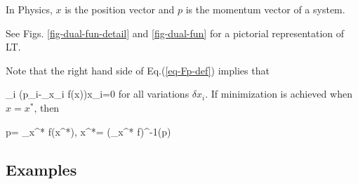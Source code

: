 In Physics, $x$ is the position
vector and $p$ is the momentum 
vector of a system.

See Figs.
\ref{fig-dual-fun-detail}
and \ref{fig-dual-fun}
for a pictorial
representation
of LT.

Note that 
the right hand side of
Eq.(\ref{eq-Fp-def})
implies that

\beq
\sum_i
(p_i-\partial_{x_i}
f(x))\delta x_i=0
\eeq 
for all variations $\delta x_i$.
If minimization is achieved
when $x=x^*$, then

\beq 
p= \nabla_{x^*} f(x^*),
\quad x^*=
(\nabla_{x^*} f)^{-1}(p)
\eeq

\subsection{Examples}

